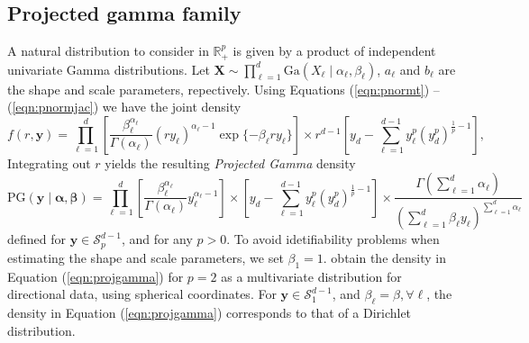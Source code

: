 \subsection{Projected gamma family}
  A natural  distribution to consider in ${\mathbb R}^p_+$ is given by a product of independent
  univariate Gamma distributions. Let
    $\bm{ X} \sim \prod_{\ell = 1}^d\text{Ga}\left(X_{\ell}\mid\alpha_{\ell},\beta_{\ell}\right)$, 
    $a_\ell$ and $b_\ell$ are the shape and scale parameters, repectively. Using Equations (\ref{eqn:pnormt}) -- (\ref{eqn:pnormjac}) we have the joint density
  \begin{equation*}
    f(r,\bm{ y}) = \prod_{\ell = 1}^{d}
      \left[\frac{\beta_{\ell}^{\alpha_{\ell}}}{\Gamma(\alpha_{\ell})}(ry_{\ell})^{\alpha_{\ell} - 1}
          \exp\lbrace-\beta_{\ell}ry_{\ell}\rbrace\right]
      \times r^{d-1}\left[y_d -
            {\textstyle \sum}_{\ell = 1}^{d-1}y_{\ell}^p\left(y_d^p\right)^{\frac{1}{p} - 1}\right],
  \end{equation*}
  Integrating out $r$ yields the resulting \emph{Projected Gamma} density
  \begin{equation}
    \label{eqn:projgamma}
    \text{PG}(\bm{ y}\mid\bm{ \alpha},\bm{ \beta}) =
          \prod_{\ell = 1}^d\left[\frac{\beta_{\ell}^{\alpha_{\ell}}}{\Gamma(\alpha_{\ell})}
                y_{\ell}^{\alpha_{\ell} - 1}\right]
      \times \left[y_d -
          {\textstyle \sum}_{\ell = 1}^{d-1}y_{\ell}^p\left(y_d^p\right)^{\frac{1}{p} - 1}\right]
      \times \frac{\Gamma({\textstyle\sum}_{\ell = 1}^d\alpha_{\ell})}{\left({\textstyle\sum}_{\ell = 1}^d
                    \beta_{\ell}y_{\ell}\right)^{{\scriptstyle\sum_{\ell = 1}^d \alpha_{\ell}}}}
  \end{equation}
  defined for $\bm{y}\in \mathcal{S}_p^{d-1}$, and for any $p>0$. To avoid idetifiability problems when estimating the shape and scale parameters, we set $\beta_1 = 1$.
  \cite{nunez2019} obtain the density in Equation (\ref{eqn:projgamma})
  for $p=2$ as a multivariate distribution for directional data, using spherical coordinates.
  For $\bm{ y}\in \mathcal{S}_1^{d-1}$, and $\beta_{\ell} = \beta, \forall\ell$, the density in Equation (\ref{eqn:projgamma}) corresponds to that of a Dirichlet distribution.
  
